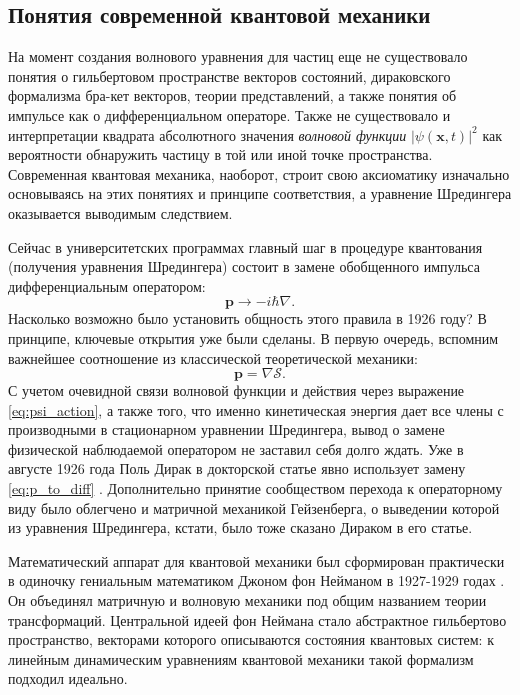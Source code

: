 \documentclass[14pt, a4paper]{extreport}
\numberwithin{equation}{section}
\begin{document}
\subsection{Понятия современной квантовой механики}

На момент создания волнового уравнения для частиц еще не существовало понятия о гильбертовом пространстве векторов состояний, дираковского формализма бра-кет векторов, теории представлений, а также понятия об импульсе как о дифференциальном операторе. Также не существовало и интерпретации квадрата абсолютного значения \textit{волновой функции} $|\psi(\mathbf{x},t)|^2$ как вероятности обнаружить частицу в той или иной точке пространства. Современная квантовая механика, наоборот, строит свою аксиоматику изначально основываясь на этих понятиях и принципе соответствия, а уравнение Шредингера оказывается выводимым следствием. 

Сейчас в университетских программах главный шаг в процедуре квантования (получения уравнения Шредингера) состоит в замене обобщенного импульса дифференциальным оператором:
\begin{equation}
	\mathbf p \rightarrow -i\hbar \nabla. \label{eq:p_to_diff}
\end{equation}
Насколько возможно было установить общность этого правила в 1926 году? В принципе, ключевые открытия уже были сделаны. В первую очередь, вспомним важнейшее соотношение из классической теоретической механики:
\begin{equation}
	\mathbf p = \nabla \mathcal S.
\end{equation}
С учетом очевидной связи волновой функции и действия через выражение \eqref{eq:psi_action}, а также того, что именно кинетическая энергия дает все члены с производными в стационарном уравнении Шредингера, вывод о замене физической наблюдаемой оператором не заставил себя долго ждать. Уже в августе 1926 года Поль Дирак в докторской статье явно использует замену \eqref{eq:p_to_diff} \cite{dirac1926theory}. Дополнительно принятие сообществом перехода к операторному виду было облегчено и матричной механикой Гейзенберга, о выведении которой из уравнения Шредингера, кстати, было тоже сказано Дираком в его статье.

Математический аппарат для квантовой механики был сформирован практически в одиночку гениальным математиком Джоном фон Нейманом в 1927-1929 годах \cite{von2018mathematical}. Он объединял матричную и волновую механики под общим названием теории трансформаций. Центральной идеей фон Неймана стало абстрактное гильбертово пространство, векторами которого описываются состояния квантовых систем: к линейным динамическим уравнениям квантовой механики такой формализм подходил идеально. 
\end{document}
